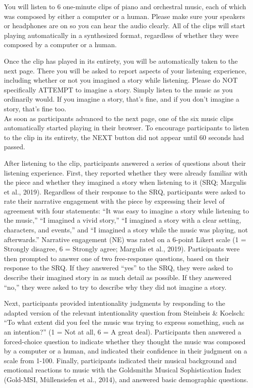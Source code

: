 \documentclass[12pt,twoside]{reedthesis}
\begin{document}
You will listen to 6 one-minute clips of piano and orchestral music, each of which was composed by either a computer or a human. Please make sure your speakers or headphones are on so you can hear the audio clearly. All of the clips will start playing automatically in a synthesized format, regardless of whether they were composed by a computer or a human.

Once the clip has played in its entirety, you will be automatically taken to the next page. There you will be asked to report aspects of your listening experience, including whether or not you imagined a story while listening. Please do NOT specifically ATTEMPT to imagine a story. Simply listen to the music as you ordinarily would. If you imagine a story, that’s fine, and if you don’t imagine a story, that’s fine too.
\\

As soon as participants advanced to the next page, one of the six music clips automatically started playing in their browser. To encourage participants to listen to the clip in its entirety, the NEXT button did not appear until 60 seconds had passed. 

After listening to the clip, participants answered a series of questions about their listening experience. First, they reported whether they were already familiar with the piece and whether they imagined a story when listening to it (SRQ; Margulis et al., 2019). Regardless of their response to the SRQ, participants were asked to rate their narrative engagement with the piece by expressing their level of agreement with four statements: “It was easy to imagine a story while listening to the music,” “I imagined a vivid story,” “I imagined a story with a clear setting, characters, and events,” and “I imagined a story while the music was playing, not afterwards.” Narrative engagement (NE) was rated on a 6-point Likert scale (1 = Strongly disagree, 6 = Strongly agree; Margulis et al., 2019). Participants were then prompted to answer one of two free-response questions, based on their response to the SRQ. If they answered “yes” to the SRQ, they were asked to describe their imagined story in as much detail as possible. If they answered “no,” they were asked to try to describe why they did not imagine a story. 

Next, participants provided intentionality judgments by responding to the adapted version of the relevant intentionality question from Steinbeis \& Koelsch: “To what extent did you feel the music was trying to express something, such as an intention?” (1 = Not at all, 6 = A great deal). Participants then answered a forced-choice question to indicate whether they thought the music was composed by a computer or a human, and indicated their confidence in their judgment on a scale from 1-100. Finally, participants indicated their musical background and emotional reactions to music with the Goldsmiths Musical Sophistication Index (Gold-MSI, Müllensiefen et al., 2014), and answered basic demographic questions.
\end{document}
